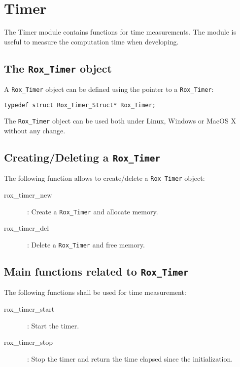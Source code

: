 \section{Timer}
\label{sec:timer}

The Timer module contains functions for time measurements. The module
is useful to measure the computation time when
developing.\\

\subsection{The {\tt Rox\_Timer} object}
\label{sse:timer_object}

A \lstinline$Rox_Timer$ object can be defined using the pointer to a \lstinline$Rox_Timer$:
\begin{lstlisting}
typedef struct Rox_Timer_Struct* Rox_Timer;
\end{lstlisting}

The \lstinline$Rox_Timer$ object can be used both under Linux, Windows or MacOS X without any change.  \\

\subsection{Creating/Deleting a {\tt Rox\_Timer}}
\label{sse:timer_creating}

The following function allows to create/delete a \lstinline$Rox_Timer$ object:
\begin {description}
\item [rox\_timer\_new]~: Create a \lstinline$Rox_Timer$ and allocate memory.
\item [rox\_timer\_del]~: Delete a \lstinline$Rox_Timer$ and free memory.
\end {description}

\subsection{Main functions related to {\tt Rox\_Timer}}
\label{sse:timer_methods}

The following functions shall be used for time measurement:

\begin {description}
\item [rox\_timer\_start]~: Start the timer.
\item [rox\_timer\_stop]~: Stop the timer and return the time elapsed since the initialization.
\end {description}

